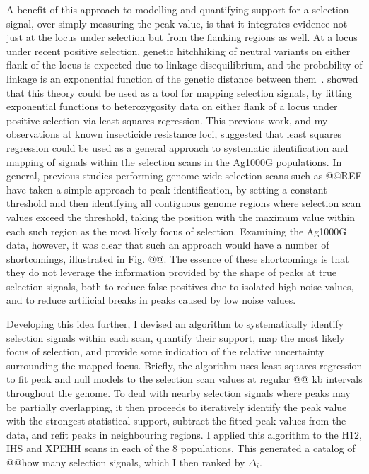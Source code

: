 \documentclass[a4paper,11pt,abstracton,hidelinks]{scrartcl}
\begin{document}
A benefit of this approach to modelling and quantifying support for a selection signal, over simply measuring the peak value, is that it integrates evidence not just at the locus under selection but from the flanking regions as well.
%
At a locus under recent positive selection, genetic hitchhiking of neutral variants on either flank of the locus is expected due to linkage disequilibrium, and the probability of linkage is an exponential function of the genetic distance between them~\parencite{MaynardSmith1974}.
%
\textcite{Wiener2011} showed that this theory could be used as a tool for mapping selection signals, by fitting exponential functions to heterozygosity data on either flank of a locus under positive selection via least squares regression.
%
This previous work, and my observations at known insecticide resistance loci, suggested that least squares regression could be used as a general approach to systematic identification and mapping of signals within the selection scans in the Ag1000G populations.
%
In general, previous studies performing genome-wide selection scans such as @@REF have taken a simple approach to peak identification, by setting a constant threshold and then identifying all contiguous genome regions where selection scan values exceed the threshold, taking the position with the maximum value within each such region as the most likely focus of selection.
%
Examining the Ag1000G data, however, it was clear that such an approach would have a number of shortcomings, illustrated in Fig. @@.
%
The essence of these shortcomings is that they do not leverage the information provided by the shape of peaks at true selection signals, both to reduce false positives due to isolated high noise values, and to reduce artificial breaks in peaks caused by low noise values.


Developing this idea further, I devised an algorithm to systematically identify selection signals within each scan, quantify their support, map the most likely focus of selection, and provide some indication of the relative uncertainty surrounding the mapped focus.
%
Briefly, the algorithm uses least squares regression to fit peak and null models to the selection scan values at regular @@ kb intervals throughout the genome.
%
To deal with nearby selection signals where peaks may be partially overlapping, it then proceeds to iteratively identify the peak value with the strongest statistical support, subtract the fitted peak values from the data, and refit peaks in neighbouring regions.
%
I applied this algorithm to the H12, IHS and XPEHH scans in each of the 8 populations.
%
This generated a catalog of @@how many selection signals, which I then ranked by $\Delta_i$.
\end{document}
